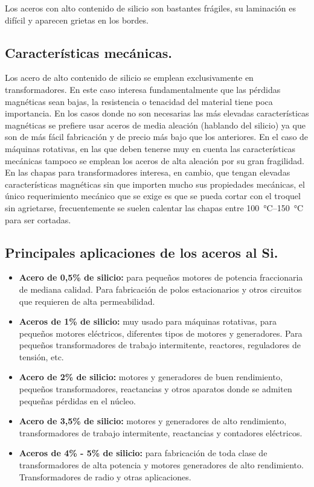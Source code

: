 \documentclass[12pt,a4paper]{article}
\begin{document}
Los aceros con alto contenido de silicio son bastantes frágiles, su laminación es difícil y aparecen grietas en los bordes.

\subsection{Características mecánicas.}

Los acero de alto contenido de silicio se emplean exclusivamente en transformadores. En este caso interesa fundamentalmente que las pérdidas magnéticas sean bajas, la resistencia o tenacidad del material tiene poca importancia. En los casos donde no son necesarias las más elevadas características magnéticas se prefiere usar aceros de media aleación (hablando del silicio) ya que son de más fácil fabricación y de precio más bajo que los anteriores. En el caso de máquinas rotativas, en las que deben tenerse muy en cuenta las características mecánicas tampoco se emplean los aceros de alta aleación por su gran fragilidad. En las chapas para transformadores interesa, en cambio, que tengan elevadas características magnéticas sin que importen mucho sus propiedades mecánicas, el único requerimiento mecánico que se exige es que se pueda cortar con el troquel sin agrietarse, frecuentemente se suelen calentar las chapas entre \SIrange[range-units=single, range-phrase={ y }]{100}{150}{\celsius} para ser cortadas.

\subsection{Principales aplicaciones de los aceros al Si.}

\begin{itemize}
    \item \textbf{Acero de 0,5\% de silicio:} para pequeños motores de potencia fraccionaria de mediana calidad. Para fabricación de polos estacionarios y otros circuitos que requieren de alta permeabilidad.
    \item \textbf{Aceros de 1\% de silicio:} muy usado para máquinas rotativas, para pequeños motores eléctricos, diferentes tipos de motores y generadores. Para pequeños transformadores de trabajo intermitente, reactores, reguladores de tensión, etc.
    \item \textbf{Acero de 2\% de silicio:} motores y generadores de buen rendimiento, pequeños transformadores, reactancias y otros aparatos donde se admiten pequeñas pérdidas en el núcleo.
    \item \textbf{Acero de 3,5\% de silicio:} motores y generadores de alto rendimiento, transformadores de trabajo intermitente, reactancias y contadores eléctricos.
    \item \textbf{Aceros de 4\% - 5\% de silicio:} para fabricación de toda clase de transformadores de alta potencia y motores generadores de alto rendimiento. Transformadores de radio y otras aplicaciones.
\end{itemize}
\end{document}
